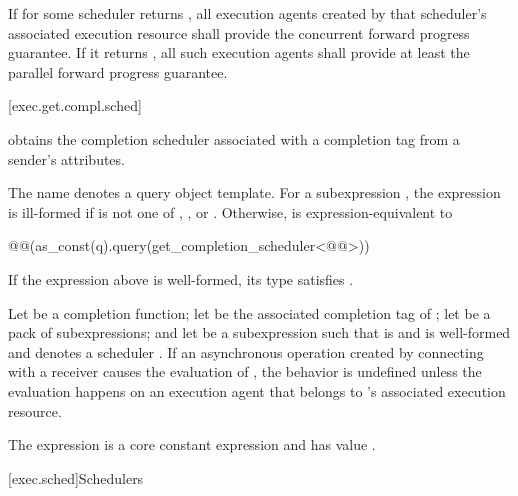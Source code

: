 \pnum
If  for some scheduler 
returns ,
all execution agents created by that scheduler's associated execution resource
shall provide the concurrent forward progress guarantee.
If it returns ,
all such execution agents
shall provide at least the parallel forward progress guarantee.

[exec.get.compl.sched]{}

\pnum
{} obtains
the completion scheduler associated with a completion tag
from a sender's attributes.

\pnum
The name  denotes a query object template.
For a subexpression ,
the expression 
is ill-formed if  is not one of
, , or .
Otherwise, 
is expression-equivalent to
\begin{codeblock}
@@(as_const(q).query(get_completion_scheduler<@@>))
\end{codeblock}
\mandates
If the expression above is well-formed,
its type satisfies .

\pnum
Let  be a completion function;
let  be
the associated completion tag of ;
let  be a pack of subexpressions; and
let  be a subexpression
such that  is  and
is well-formed and denotes a scheduler .
If an asynchronous operation
created by connecting  with a receiver 
causes the evaluation of ,
the behavior is undefined
unless the evaluation happens on an execution agent
that belongs to 's associated execution resource.

\pnum
The expression
is a core constant expression and has value .

[exec.sched]{Schedulers}

